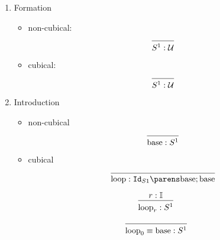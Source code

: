 \documentclass[11pt]{article}
\begin{document}
\begin{enumerate}
    \item Formation
        \begin{itemize}
            \item non-cubical:
\[
  \begin{prooftree}
      \infer0{\oftype{S^1}{\UU}}
  \end{prooftree}
\]
            \item cubical:
\[
  \begin{prooftree}
      \infer0{\oftype{S^1}{\UU}}
  \end{prooftree}
\]
        \end{itemize}

    \item Introduction
        \begin{itemize}
            \item non-cubical
\[
    \begin{prooftree}
        \infer0{\oftype{\base}{S^1}}
    \end{prooftree}
\]
            \item cubical
\[
    \begin{prooftree}
        \infer0{\oftype{\loops}{\idtype{S1}{\base}{\base}}}
    \end{prooftree}
\]
        \end{itemize}
\[
    \begin{prooftree}
        \hypo{\oftype{r}{\bI}}
        \infer1{\oftype{\loops_r}{S^1}}
    \end{prooftree}
\]
 
\[
    \begin{prooftree}
        \infer0{\oftype{\eqtype{\loops_0}{\base}}{S^1}}
    \end{prooftree}
\]


\end{enumerate}
\end{document}
